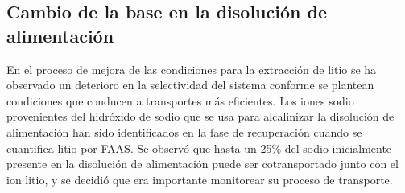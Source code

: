 
\subsection{Cambio de la base en la disolución de alimentación}
En el proceso de mejora de las condiciones para la extracción de litio se ha observado un dete\-rioro en la selectividad del sistema conforme se plantean condiciones que conducen a transportes más eficientes. Los iones sodio provenientes del hidróxido de sodio que se usa para alcalinizar la disolución de alimentación han sido identificados en la fase de recuperación cuando se cuantifica litio por \ac{FAAS}. Se observó que hasta un 25\% del sodio inicialmente presente en la disolución de alimentación puede ser cotransportado junto con el ion litio, y se decidió que era importante monitorear su proceso de transporte. 

